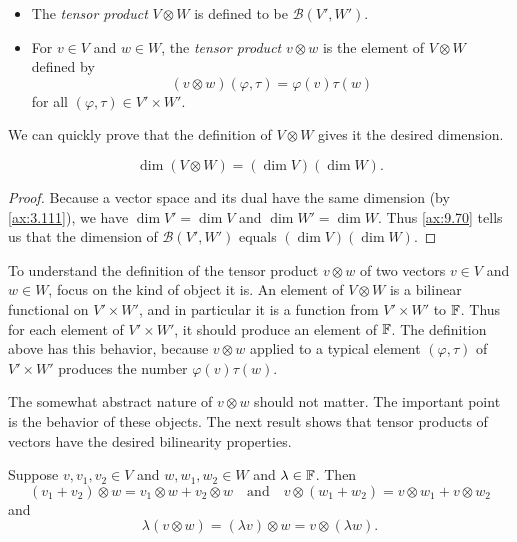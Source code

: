 \begin{definition}\label{ax:9.71}\leavevmode
\begin{itemize}
\item The \emph{tensor product} $V\otimes W$ is defined to be
  $\mathcal{B}(V',W')$.
\item For $v\in V$ and $w\in W$, the \emph{tensor product} $v\otimes w$ is the
  element of $V\otimes W$ defined by
  \[ (v\otimes w)(\varphi,\tau) = \varphi(v)\tau(w) \]
  for all $(\varphi,\tau)\in V'\times W'$.
\end{itemize}
\end{definition}

We can quickly prove that the definition of $V\otimes W$ gives it the desired
dimension.

\begin{result}\label{ax:9.72}\leavevmode
\[ \dim(V\otimes W)=(\dim V)(\dim W). \]
\end{result}

\begin{proof}
Because a vector space and its dual have the same dimension (by
\ref{ax:3.111}), we have $\dim V'=\dim V$ and $\dim W'=\dim W$. Thus
\ref{ax:9.70} tells us that the dimension of $\mathcal{B}(V',W')$ equals
$(\dim V)(\dim W)$.
\end{proof}

To understand the definition of the tensor product $v\otimes w$ of two vectors
$v\in V$ and $w\in W$, focus on the kind of object it is. An element of
$V\otimes W$ is a bilinear functional on $V'\times W'$, and in particular it is
a function from $V'\times W'$ to $\mathbb{F}$. Thus for each element of $V'\times W'$,
it should produce an element of $\mathbb{F}$. The definition above has this behavior,
because $v\otimes w$ applied to a typical element $(\varphi,\tau)$ of
$V'\times W'$ produces the number $\varphi(v)\tau(w)$.

The somewhat abstract nature of $v\otimes w$ should not matter. The important
point is the behavior of these objects. The next result shows that tensor
products of vectors have the desired bilinearity properties.

\begin{result}\label{ax:9.73}
Suppose $v,v_1,v_2\in V$ and $w,w_1,w_2\in W$ and $\lambda\in\mathbb{F}$. Then
\[ (v_1+v_2)\otimes w = v_1\otimes w+v_2\otimes w \quad\text{and}\quad
   v\otimes(w_1+w_2) = v\otimes w_1+v\otimes w_2 \]
and
\[ \lambda(v\otimes w) = (\lambda v)\otimes w = v\otimes(\lambda w). \]
\end{result}

